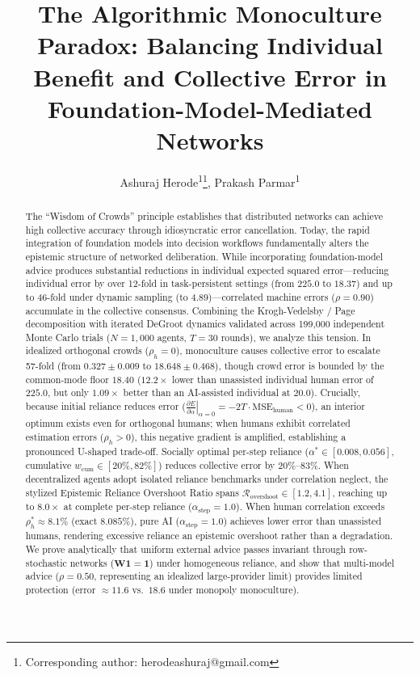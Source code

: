 \documentclass
[letterpaper]{article}
\title{The Algorithmic Monoculture Paradox: Balancing Individual Benefit and Collective Error in Foundation-Model-Mediated Networks}
\author{
    Ashuraj Herode\textsuperscript{\rm 1}\thanks{Corresponding author: herodeashuraj@gmail.com},
    Prakash Parmar\textsuperscript{\rm 1}
}
\begin{document}
\maketitle

\begin{abstract}
The ``Wisdom of Crowds'' principle establishes that distributed networks can achieve high collective accuracy through idiosyncratic error cancellation. Today, the rapid integration of foundation models into decision workflows fundamentally alters the epistemic structure of networked deliberation. While incorporating foundation-model advice produces substantial reductions in individual expected squared error—reducing individual error by over 12-fold in task-persistent settings (from $225.0$ to $18.37$) and up to 46-fold under dynamic sampling (to $4.89$)—correlated machine errors ($\rho = 0.90$) accumulate in the collective consensus. Combining the Krogh-Vedelsby / Page decomposition with iterated DeGroot dynamics validated across 199,000 independent Monte Carlo trials ($N = 1,000$ agents, $T = 30$ rounds), we analyze this tension. In idealized orthogonal crowds ($\rho_h = 0$), monoculture causes collective error to escalate 57-fold (from $0.327 \pm 0.009$ to $18.648 \pm 0.468$), though crowd error is bounded by the common-mode floor $18.40$ ($12.2\times$ lower than unassisted individual human error of $225.0$, but only $1.09\times$ better than an AI-assisted individual at $20.0$). Crucially, because initial reliance reduces error ($\left.\frac{\partial E}{\partial \alpha}\right|_{\alpha=0} = -2T \cdot \text{MSE}_{\text{human}} < 0$), an interior optimum exists even for orthogonal humans; when humans exhibit correlated estimation errors ($\rho_h > 0$), this negative gradient is amplified, establishing a pronounced U-shaped trade-off. Socially optimal per-step reliance ($\alpha^* \in [0.008, 0.056]$, cumulative $w_{\text{cum}} \in [20\%, 82\%]$) reduces collective error by $20\%\text{--}83\%$. When decentralized agents adopt isolated reliance benchmarks under correlation neglect, the stylized Epistemic Reliance Overshoot Ratio spans $\mathcal{R}_{\text{overshoot}} \in [1.2, 4.1]$, reaching up to $8.0\times$ at complete per-step reliance ($\alpha_{\text{step}} = 1.0$). When human correlation exceeds $\rho_h^* \approx 8.1\%$ (exact $8.085\%$), pure AI ($\alpha_{\text{step}} = 1.0$) achieves lower error than unassisted humans, rendering excessive reliance an epistemic overshoot rather than a degradation. We prove analytically that uniform external advice passes invariant through row-stochastic networks ($\mathbf{W}\mathbf{1} = \mathbf{1}$) under homogeneous reliance, and show that multi-model advice ($\rho = 0.50$, representing an idealized large-provider limit) provides limited protection (error $\approx 11.6$ vs.\ $18.6$ under monopoly monoculture).
\end{abstract}
\end{document}
